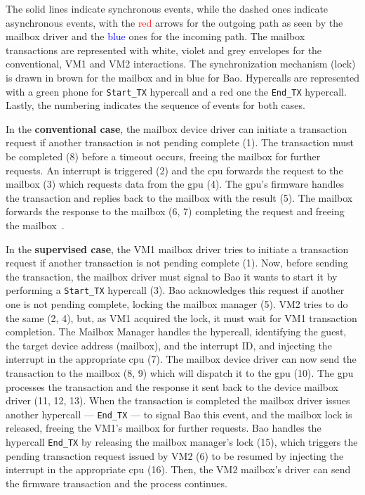 The solid lines
indicate synchronous events, while the dashed ones
indicate asynchronous events, with the \textcolor{red}{red} arrows for the
outgoing path as seen by the mailbox driver and the \textcolor{blue}{blue} ones for the
incoming path. The mailbox transactions are represented with white, violet and
grey envelopes for the conventional, VM1 and VM2 interactions. The
synchronization mechanism (lock) is drawn in brown for the mailbox and in blue
for Bao. Hypercalls are represented with a green phone for \texttt{Start\_TX}
hypercall and a red one the \texttt{End\_TX} hypercall. Lastly, the numbering
indicates the sequence of events for both cases.

In the \textbf{conventional case}, the mailbox device driver can initiate a transaction
request if another transaction is not pending complete (1). The transaction must
be completed (8) before a timeout occurs, freeing the mailbox for further
requests. An interrupt is triggered (2) and the \gls{cpu} forwards the request
to the mailbox (3) which requests data from the \gls{gpu} (4). The \gls{gpu}'s
firmware handles the transaction and replies back to the mailbox with the
result (5). The mailbox forwards the response to the mailbox (6, 7) completing
the request and freeing the mailbox~\cite{rpi4-mbox-driver}. 

In the \textbf{supervised case}, the VM1 mailbox driver tries to initiate a
transaction request if another transaction is not pending complete (1). Now,
before sending the transaction, the mailbox driver must signal to Bao it wants
to start it by performing a \texttt{Start\_TX} hypercall (3). Bao acknowledges
this request if another one is not pending complete, locking the mailbox manager
(5). VM2 tries to do the same (2, 4), but, as VM1 acquired the lock, it must
wait for VM1 transaction completion. The Mailbox Manager handles the hypercall,
identifying the guest, the target device address (mailbox), and the interrupt
ID, and injecting the interrupt in the appropriate \gls{cpu} (7). The mailbox
device driver can now send the transaction to the mailbox (8, 9) which will
dispatch it to the \gls{gpu} (10). The \gls{gpu} processes the transaction and
the response it sent back to the device mailbox driver (11, 12, 13). When the
transaction is completed the mailbox driver issues another hypercall ---
\texttt{End\_TX} --- to signal Bao this event, and the mailbox lock is released,
freeing the VM1's mailbox for further requests. Bao handles the hypercall
\texttt{End\_TX} by releasing the mailbox manager's lock (15), which triggers
the pending transaction request issued by VM2 (6) to be resumed by injecting the
interrupt in the appropriate \gls{cpu} (16). Then, the VM2 mailbox's driver can
send the firmware transaction and the process continues.

